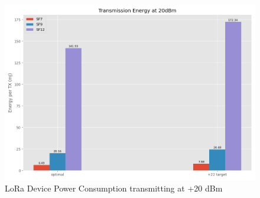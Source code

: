 \begin{figure}[h!]
    \centering
    \includegraphics[width=\columnwidth]{figures/loratx20dbmbar.png}
    \caption{LoRa Device Power Consumption transmitting at +20 dBm}
    \label{fig:loratx20dbmbar}
\end{figure}